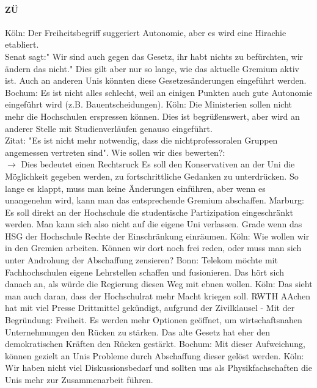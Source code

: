     \paragraph{ZÜ}
      \begin{outline}
        \1 Köln: Der Freiheitsbegriff suggeriert Autonomie, aber es wird eine Hirachie etabliert. \\
        Senat sagt:" Wir sind auch gegen das Gesetz, ihr habt nichts zu befürchten, wir ändern das nicht." Dies gilt aber nur so lange, wie das aktuelle Gremium aktiv ist.
        \1 Auch an anderen Unis könnten diese Gesetzesänderungen eingeführt werden.
        \1 Bochum: Es ist nicht alles schlecht, weil an einigen Punkten auch gute Autonomie eingeführt wird (z.B. Bauentscheidungen).
        \1 Köln: Die Ministerien sollen nicht mehr die Hochschulen erspressen können. Dies ist begrüßenswert, aber wird an anderer Stelle mit Studienverläufen genauso eingeführt. \\
        \1 Zitat: "Es ist nicht mehr notwendig, dass die nichtprofessoralen Gruppen angemessen vertreten sind".
        \2 Wie sollen wir dies bewerten?: \\
        $\rightarrow$ Dies bedeutet einen Rechtsruck
        \1 Es soll den Konservativen an der Uni die Möglichkeit gegeben werden, zu fortschrittliche Gedanken zu unterdrücken.
        \1 So lange es klappt, muss man keine Änderungen einführen, aber wenn es unangenehm wird, kann man das entsprechende Gremium abschaffen.
        \1 Marburg: Es soll direkt an der Hochschule die studentische Partizipation eingeschränkt werden. Man kann sich also nicht auf die eigene Uni verlassen. Grade wenn das HSG der Hochschule Rechte der Einschränkung einräumen.
        \1 Köln: Wie wollen wir in den Gremien arbeiten. Können wir dort noch frei reden, oder muss man sich unter Androhung der Abschaffung zensieren?
        \1 Bonn: Telekom möchte mit Fachhochschulen eigene Lehrstellen schaffen und fusionieren. Das hört sich danach an, als würde die Regierung diesen Weg mit ebnen wollen.
        \2 Köln: Das sieht man auch daran, dass der Hochschulrat mehr Macht kriegen soll.
        \2 RWTH AAchen hat mit viel Presse Drittmittel gekündigt, aufgrund der Zivilklausel - Mit der Begründung: Freiheit.
        \1 Es werden mehr Optionen geöffnet, um wirtschaftsnahen Unternehmungen den Rücken zu stärken.
        \1 Das alte Gesetz hat eher den demokratischen Kräften den Rücken gestärkt.
        \1 Bochum: Mit dieser Aufweichung, können gezielt an Unis Probleme durch Abschaffung dieser gelöst werden.
        \1 Köln: Wir haben nicht viel Diskussionsbedarf und sollten uns als Physikfachschaften die Unis mehr zur Zusammenarbeit führen.

\end{outline}
